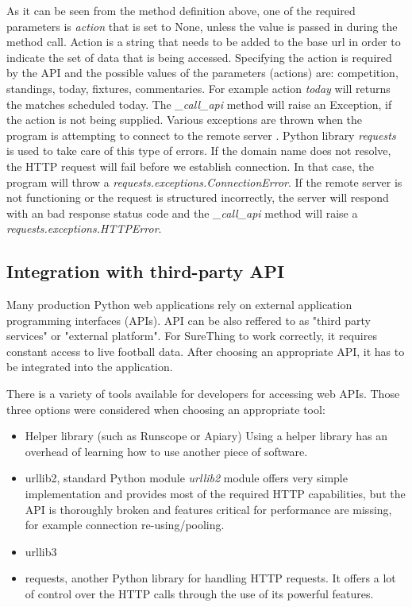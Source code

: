 As it can be seen from the method definition above, one of the required parameters is \emph{action} that is set to None, unless the value is passed in during the method call. Action is a string that needs to be added to the base url in order to indicate the set of data that is being accessed. Specifying the action is required by the API and the possible values of the parameters (actions) are: competition, standings, today, fixtures, commentaries. For example action \emph{today} will returns the matches scheduled today. The \emph{\_call\_api} method will raise an Exception, if the action is not being supplied. Various exceptions are thrown when the program is attempting to connect to the remote server \cite{article:httpRequestsExceptions}. Python library \emph{requests} is used to take care of this type of errors. \cite{documentation:PythonRequests} If the domain name does not resolve, the HTTP request will fail before we establish connection. In that case, the program will throw a \emph{requests.exceptions.ConnectionError}. If the remote server is not functioning or the request is structured incorrectly, the server will respond with an bad response status code and the \emph{\_call\_api} method will raise a \emph{requests.exceptions.HTTPError}.

\subsection{Integration with third-party API}
Many production Python web applications rely on external application programming interfaces (APIs). API can be also reffered to as "third party services" or "external platform".\cite{apiintegration}  For SureThing to work correctly, it requires constant access to live football data. After choosing an appropriate API, it has to be integrated into the application. 

There is a variety of tools available for developers for accessing web APIs. Those three options were considered when choosing an appropriate tool:
	
\begin{itemize}
	\item Helper library (such as Runscope or Apiary)
	Using a helper library has an overhead of learning how to use another piece of software.
	\item urllib2, standard Python module
	\emph{urllib2} module offers very simple implementation and provides most of the required HTTP capabilities, but the API is thoroughly broken and features critical for performance are missing, for example connection re-using/pooling. 
	\item urllib3
	\item requests, another Python library for handling HTTP requests. It offers a lot of control over the HTTP calls through the use of its powerful features.
\end{itemize}
		
